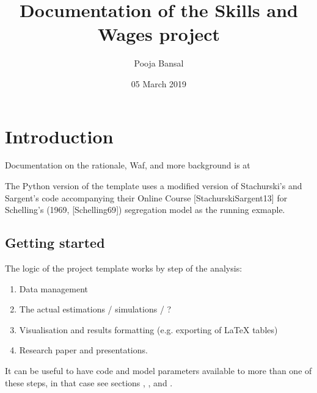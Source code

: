 \documentclass[a4paper,11pt,english]{sphinxmanual}
\title{Documentation of the Skills and Wages project}
\date{05 March 2019}
\author{Pooja Bansal}
\begin{document}
\pagestyle{empty}
\maketitle
\pagestyle{plain}
\sphinxtableofcontents
\pagestyle{normal}
\label{\detokenize{index::doc}}



\chapter{Introduction}
\label{\detokenize{introduction:introduction}}\label{\detokenize{introduction:id1}}\label{\detokenize{introduction::doc}}
Documentation on the rationale, Waf, and more background is at 

The Python version of the template uses a modified version of Stachurski’s and Sargent’s code accompanying their Online Course {[}StachurskiSargent13{]} for Schelling’s (1969, {[}Schelling69{]}) segregation model as the running exmaple.


\section{Getting started}
\label{\detokenize{introduction:getting-started}}\label{\detokenize{introduction:id4}}
  

The logic of the project template works by step of the analysis:
\begin{enumerate}
\def\theenumi{\arabic{enumi}}
\def\labelenumi{\theenumi .}
\makeatletter\def\p@enumii{\p@enumi \theenumi .}\makeatother
\item {} 
Data management

\item {} 
The actual estimations / simulations / ?

\item {} 
Visualisation and results formatting (e.g. exporting of LaTeX tables)

\item {} 
Research paper and presentations.

\end{enumerate}

It can be useful to have code and model parameters available to more than one of these steps, in that case see sections , , and {\hyperref[\detokenize{library:library}]{}}.
\end{document}
